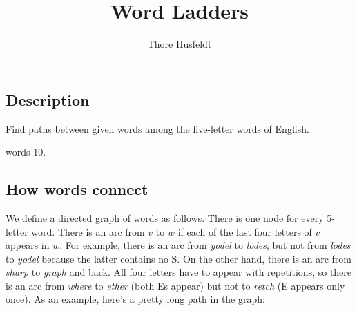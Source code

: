 \documentclass{tufte-handout}
\title{Word Ladders}
\author{Thore Husfeldt}
\begin{document}
\maketitle

\subsection{Description}
Find paths between given words among the five-letter words of English.

\begin{marginfigure}
  \caption{words-10.}
\end{marginfigure}

\subsection{How words connect}

We define a directed graph of words as follows.
There is one node for every 5-letter word.
There is an arc from $v$ to $w$ if each of the last four letters of $v$ appears in $w$.
For example, there is an arc from \emph{yodel} to \emph{lodes}, but not from \emph{lodes} to \emph{yodel} because the latter contains no S. 
On the other hand, there is an arc from \emph{sharp} to \emph{graph} and back. 
All four letters have to appear with repetitions, so there is an arc from \emph{where} to \emph{ether} (both Es appear) but not to \emph{retch} (E appears only once).
As an example, here’s a pretty long path in the graph: 
\bigskip
\end{document}
